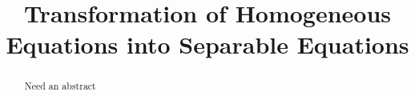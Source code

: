 \documentclass{ximera}
\title{Transformation of Homogeneous Equations into Separable Equations}%
\begin{document}
\begin{abstract}
Need an abstract
\end{abstract}

\maketitle







\end{document}
